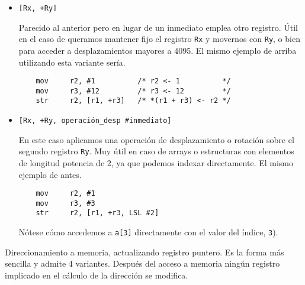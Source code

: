 \begin{descript}
\begin{itemize}
\begin{lstlisting}
    mov     r2, #1          /* r2 <- 1          */
    str     r2, [r1, #+12]  /* *(r1 + 12) <- r2 */
\end{lstlisting}

    Nótese que hemos multiplicado por 4 el desplazamiento porque cada
    elemento del array son 4 bytes. El desplazamiento no puede ser mayor
    de 12 bits, por lo que nuestro rango está límitado entre {\tt [Rx, \#-4095]}
    y {\tt [Rx, \#+4095]}.

  \item{\tt [Rx, +Ry] \newline
            [Rx, -Ry] \newline}

    Parecido al anterior pero en lugar de un inmediato emplea otro registro. Útil
    en el caso de queramos mantener fijo el registro {\tt Rx} y movernos con {\tt Ry},
    o bien para acceder a desplazamientos mayores a 4095. El mismo ejemplo de
    arriba utilizando esta variante sería.

\begin{lstlisting}
    mov     r2, #1          /* r2 <- 1          */
    mov     r3, #12         /* r3 <- 12         */
    str     r2, [r1, +r3]   /* *(r1 + r3) <- r2 */
\end{lstlisting}

  \item{\tt [Rx, +Ry, operación\_desp \#inmediato]  \newline}

    En este caso aplicamos una operación de desplazamiento
    o rotación sobre el segundo registro {\tt Ry}. Muy útil
    en caso de arrays o estructuras con elementos de longitud
    potencia de 2, ya que podemos indexar directamente. El
    mismo ejemplo de antes.
    
\begin{lstlisting}
    mov     r2, #1
    mov     r3, #3
    str     r2, [r1, +r3, LSL #2]
\end{lstlisting}

    Nótese cómo accedemos a {\tt a[3]}
    directamente con el valor del índice, {\tt 3}).
\end{itemize}


  \item[Direccionamiento a memoria, actualizando registro puntero.]
    Es la forma más sencilla y admite 4 variantes. Después del acceso
    a memoria ningún registro implicado en el cálculo de la dirección
    se modifica.


\end{descript}


\chapterend{}

